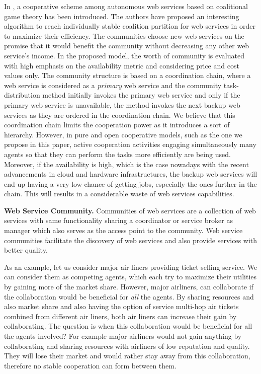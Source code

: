 \documentclass[10pt,journal,cspaper,compsoc]{IEEEtran}
\begin{document}
In \cite{10.1109/TSC.2012.12}, a cooperative scheme among
autonomous web services based on coalitional game theory has been
introduced. The authors have proposed an interesting algorithm to
reach individually stable coalition partition for web services in
order to maximize their efficiency. The communities choose new web
services on the promise that it would benefit the community
without decreasing any other web service's income. In the proposed
model, the worth of community is evaluated with high emphasis on
the availability metric and considering price and cost values
only. The community structure is based on a coordination chain,
where a web service is considered as a \emph{primary} web service
and the community task-distribution method initially invokes the
primary web service and only if the primary web service is
unavailable, the method invokes the next backup web services as
they are ordered in the coordination chain. We believe that this
coordination chain limits the cooperation power as it introduces a
sort of hierarchy. However, in pure and open cooperative models,
such as the one we propose in this paper, active cooperation
activities engaging simultaneously many agents so that they can
perform the tasks more efficiently are being used. Moreover, if
the availability is high, which is the case nowadays with the
recent advancements in cloud and hardware infrastructures, the
backup web services will end-up having a very low chance of
getting jobs, especially the ones further in the chain. This will
results in a considerable waste of web services capabilities.

\textbf{Web Service Community.}
Communities of web services are a collection of web services with same functionality sharing a
coordinator or service broker as manager which also serves as the access point to the community. Web service communities facilitate the discovery of web services and also provide services with better quality.

As an example, let us consider major air liners providing ticket selling service. We can consider them as competing agents, which each try to maximize their utilities by gaining more of the market share. However, major airliners, can collaborate if the collaboration would be beneficial for \emph{all} the agents. By sharing resources and also market share and also having the option of service multi-hop air tickets combined from different air liners, both air liners can increase their gain by collaborating. The question is when this collaboration would be beneficial for all the agents involved? For example major airliners would not gain anything by collaborating and sharing resources with airliners of low reputation and quality. They will lose their market and would rather stay away from this collaboration, therefore no stable cooperation can form between them.
\end{document}
